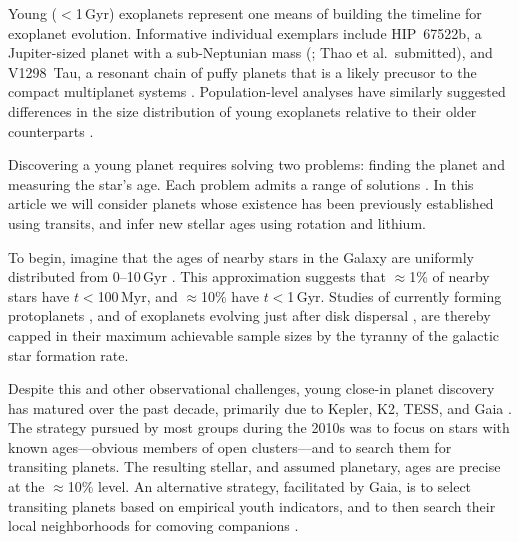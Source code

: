 \documentclass[11pt,twocolumn,tighten,linenumbers,trackchanges]{aastex63}
\begin{document}
Young ($<$1\,Gyr) exoplanets represent one means of building the
timeline for exoplanet evolution.  Informative individual exemplars
include HIP~67522b, a Jupiter-sized planet with a sub-Neptunian mass
(\citealt{Rizzuto_2020}; Thao et al.~submitted), and V1298~Tau, a
resonant chain of puffy planets that is a likely precusor to the
compact multiplanet systems \citep{David_2019}.  Population-level
analyses have similarly suggested differences in the size distribution
of young exoplanets relative to their older counterparts
\citep{Berger_2020b_rpage,David_2021,Sandoval_2021,2023AJ....166..248C,2024arXiv240303261V}.

Discovering a young planet requires solving two problems: finding the
planet and measuring the star's age.  Each problem admits a range of
solutions
\citep[e.g.][]{2008Sci...322.1348M,2012ApJ...756L..33Q,2024AJ....167..193T}.
In this article we will consider planets whose existence has been
previously established using transits, and infer new stellar ages
using rotation and lithium.

To begin, imagine that the ages of nearby stars in the Galaxy are
uniformly distributed from 0--10\,Gyr
\citep[][]{2000MNRAS.318..658B,Nordstrom_2004}.  This approximation
suggests that $\approx$1\% of nearby stars have $t$$<$100\,Myr, and
$\approx$10\% have $t$$<$1\,Gyr.  Studies of currently forming
protoplanets \citep{2018A&A...617A..44K}, and of exoplanets evolving
just after disk dispersal \citep[e.g.][]{2022MNRAS.512.5067K}, are
thereby capped in their maximum achievable sample sizes by the tyranny
of the galactic star formation rate.

Despite this and other observational challenges, young close-in planet
discovery has matured over the past decade, primarily due to Kepler,
K2, TESS, and Gaia
\citep[e.g.][]{Meibom_2013,Mann_K2_25_2016,Curtis_2018,Livingston_2018,David_2019,Bouma_2020_toi837,Rizzuto_2020,Plavchan_2020,Newton_2021,Nardiello_2022,Barber_2022,Zhou_2022,Zakhozhay_2022,Wood_2023}.
The strategy pursued by most groups during the 2010s was to focus on
stars with known ages---obvious members of open clusters---and to
search them for transiting planets.  The resulting stellar, and
assumed planetary, ages are precise at the $\approx$10\% level.  
An alternative strategy, facilitated by Gaia, is to select transiting
planets based on empirical youth indicators, and to then search their local
neighborhoods for comoving companions \citep[e.g.][]{Tofflemire_2021}.
\end{document}
